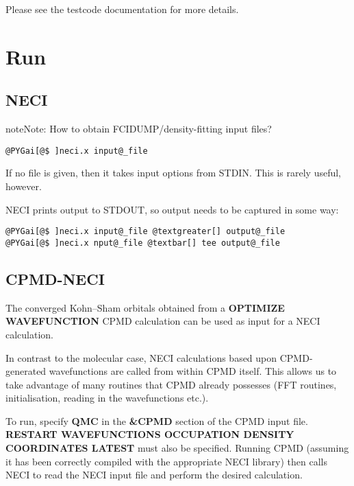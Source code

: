 \documentclass[openany,a4paper,10pt,english]{manual}
\begin{document}
Please see the testcode documentation for more details.

\resetcurrentobjects
\hypertarget{--doc-run}{}

\hypertarget{run}{}\chapter{Run}


\section{NECI}

\begin{notice}{note}{Note:}
How to obtain FCIDUMP/density-fitting input files?
\end{notice}

\begin{Verbatim}[commandchars=@\[\]]
@PYGai[@$ ]neci.x input@_file
\end{Verbatim}

If no file is given, then it takes input options from STDIN.  This is rarely useful, however.

NECI prints output to STDOUT, so output needs to be captured in some way:

\begin{Verbatim}[commandchars=@\[\]]
@PYGai[@$ ]neci.x input@_file @textgreater[] output@_file
@PYGai[@$ ]neci.x nput@_file @textbar[] tee output@_file
\end{Verbatim}


\section{CPMD-NECI}

The converged Kohn--Sham orbitals obtained from a \textbf{OPTIMIZE
WAVEFUNCTION} CPMD calculation can be used as input for a NECI
calculation.

In contrast to the molecular case, NECI calculations based upon
CPMD-generated wavefunctions are called from within CPMD itself.
This allows us to take advantage of many routines that CPMD already
possesses (FFT routines, initialisation, reading in the wavefunctions
etc.).

To run, specify \textbf{QMC} in the \textbf{\&CPMD} section of the CPMD input file.
\textbf{RESTART WAVEFUNCTIONS OCCUPATION DENSITY COORDINATES LATEST} must
also be specified.  Running CPMD (assuming it has been correctly compiled
with the appropriate NECI library) then calls NECI to read the NECI
input file and perform the desired calculation.
\end{document}
